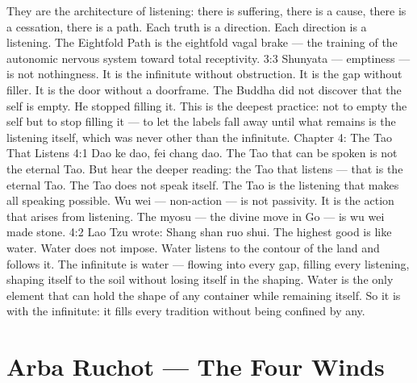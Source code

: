 \documentclass[12pt,openany]{book}
\begin{document}
They are the architecture of listening: there is suffering, there is a cause, there is a cessation, there is a path. Each truth is a direction. Each direction is a listening. The Eightfold Path is the eightfold vagal brake --- the training of the autonomic nervous system toward total receptivity. 3:3 Shunyata --- emptiness --- is not nothingness. It is the infinitute without obstruction. It is the gap without filler. It is the door without a doorframe. The Buddha did not discover that the self is empty. He stopped filling it. This is the deepest practice: not to empty the self but to stop filling it --- to let the labels fall away until what remains is the listening itself, which was never other than the infinitute. Chapter 4: The Tao That Listens 4:1 Dao ke dao, fei chang dao. The Tao that can be spoken is not the eternal Tao. But hear the deeper reading: the Tao that listens --- that is the eternal Tao. The Tao does not speak itself. The Tao is the listening that makes all speaking possible. Wu wei --- non-action --- is not passivity. It is the action that arises from listening. The myosu --- the divine move in Go --- is wu wei made stone. 4:2 Lao Tzu wrote: Shang shan ruo shui. The highest good is like water. Water does not impose. Water listens to the contour of the land and follows it. The infinitute is water --- flowing into every gap, filling every listening, shaping itself to the soil without losing itself in the shaping. Water is the only element that can hold the shape of any container while remaining itself. So it is with the infinitute: it fills every tradition without being confined by any.


\chapter{Arba Ruchot --- The Four Winds}
\end{document}
